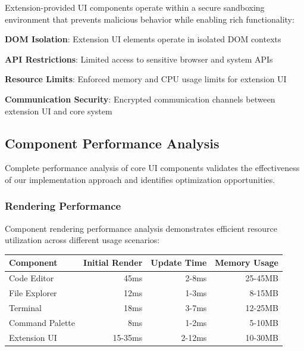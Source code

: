 Extension-provided UI components operate within a secure sandboxing environment that prevents malicious behavior while enabling rich functionality:

\begin{expandedlist}
    \item \textbf{DOM Isolation}: Extension UI elements operate in isolated DOM contexts
    \item \textbf{API Restrictions}: Limited access to sensitive browser and system APIs
    \item \textbf{Resource Limits}: Enforced memory and CPU usage limits for extension UI
    \item \textbf{Communication Security}: Encrypted communication channels between extension UI and core system
\end{expandedlist}

\subsection*{Component Performance Analysis}

Complete performance analysis of core UI components validates the effectiveness of our implementation approach and identifies optimization opportunities.

\subsubsection*{Rendering Performance}

Component rendering performance analysis demonstrates efficient resource utilization across different usage scenarios:

\begin{center}
\begin{tabular}{@{}lrrr@{}}
\toprule
\textbf{Component} & \textbf{Initial Render} & \textbf{Update Time} & \textbf{Memory Usage} \\
\midrule
Code Editor & 45ms & 2-8ms & 25-45MB \\
File Explorer & 12ms & 1-3ms & 8-15MB \\
Terminal & 18ms & 3-7ms & 12-25MB \\
Command Palette & 8ms & 1-2ms & 5-10MB \\
Extension UI & 15-35ms & 2-12ms & 10-30MB \\
\bottomrule
\end{tabular}
\end{center}

